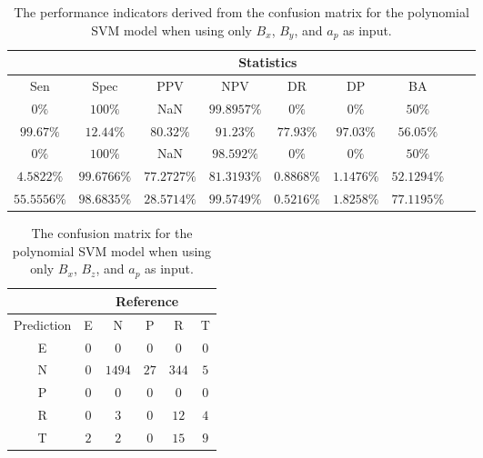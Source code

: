 \begin{table}[!ht]
	\centering
	\begin{tabular}{|c|c|c|c|c|c|c|c|c|}
		\hline
		 & \multicolumn{7}{c|}{Statistics} \\ \hline
		Sen & Spec & PPV & NPV & DR & DP & BA \\ \hline
		$0\%$ & $100\%$ & NaN & $99.8957\%$ & $0\%$ & $0\%$ & $50\%$ \\ \hline
		$99.67\%$ & $12.44\%$ & $80.32\%$ & $91.23\%$ & $77.93\%$ & $97.03\%$ & $56.05\%$ \\ \hline
		$0\%$ & $100\%$ & NaN & $98.592\%$ & $0\%$ & $0\%$ & $50\%$ \\ \hline
		$4.5822\%$ & $99.6766\%$ & $77.2727\%$ & $81.3193\%$ & $0.8868\%$ & $1.1476\%$ & $52.1294\%$ \\ \hline
		$55.5556\%$ & $98.6835\%$ & $28.5714\%$ & $99.5749\%$ & $0.5216\%$ & $1.8258\%$ & $77.1195\%$ \\ \hline
	\end{tabular}
	\caption{The performance indicators derived from the confusion matrix for the polynomial SVM model when using only $B_{x}$, $B_{y}$, and $a_{p}$ as input.}
	\label{tab:cs:xyap:svmPoly}
\end{table}

\begin{table}[!ht]
	\centering
	\begin{tabular}{|c|c|c|c|c|c|}
		\hline
		 & \multicolumn{5}{|c|}{Reference} \\ \hline
		 Prediction & E & N & P & R & T \\ \hline
		 E & $0$ & $0$ & $0$ & $0$ & $0$ \\ \hline
		 N & $0$ & $1494$ & $27$ & $344$ & $5$ \\ \hline
		 P & $0$ & $0$ & $0$ & $0$ & $0$ \\ \hline
		 R & $0$ & $3$ & $0$ & $12$ & $4$ \\ \hline
		 T & $2$ & $2$ & $0$ & $15$ & $9$ \\ \hline
	\end{tabular}
	\caption{The confusion matrix for the polynomial SVM model when using only $B_{x}$, $B_{z}$, and $a_{p}$ as input.}
	\label{tab:cm:xzap:svmPoly}
\end{table}

